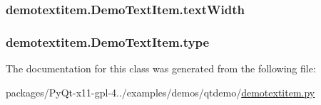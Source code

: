 \subsubsection[{text\+Width}]{\setlength{\rightskip}{0pt plus 5cm}demotextitem.\+Demo\+Text\+Item.\+text\+Width}\label{classdemotextitem_1_1DemoTextItem_aebfeb233be049dfd36541454cfba3bd5}
\hypertarget{classdemotextitem_1_1DemoTextItem_a2fe34508b4fadf6b17c054fc05049bde}{}
\subsubsection[{type}]{\setlength{\rightskip}{0pt plus 5cm}demotextitem.\+Demo\+Text\+Item.\+type}\label{classdemotextitem_1_1DemoTextItem_a2fe34508b4fadf6b17c054fc05049bde}


The documentation for this class was generated from the following file\+:\begin{DoxyCompactItemize}
\item 
packages/\+Py\+Qt-\/x11-\/gpl-\/4../examples/demos/qtdemo/\hyperlink{demotextitem_8py}{demotextitem.\+py}\end{DoxyCompactItemize}
